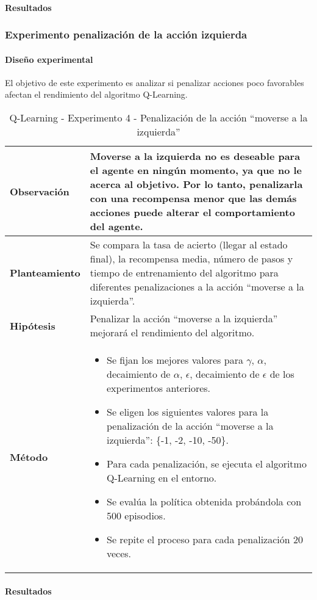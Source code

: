 \paragraph{Resultados}

\subsubsection{Experimento penalización de la acción izquierda}

\paragraph{Diseño experimental}
El objetivo de este experimento es analizar si penalizar acciones poco favorables afectan el rendimiento del algoritmo Q-Learning.
\begin{table}[H]
    \centering
    \begin{tabularx}{\textwidth}{|p{4cm}|X|} %
        \hline %
        \textbf{Observación} & Moverse a la izquierda no es deseable para el agente en ningún momento, ya que no le acerca al objetivo. Por lo tanto, penalizarla con una recompensa menor que las demás acciones puede alterar el comportamiento del agente.
        \\ \hline 
        \textbf{Planteamiento} & Se compara la tasa de acierto (llegar al estado final), la recompensa media, número de pasos y tiempo de entrenamiento del algoritmo para diferentes penalizaciones a la acción ``moverse a la izquierda''.
        \\ \hline
        \textbf{Hipótesis} & Penalizar la acción ``moverse a la izquierda'' mejorará el rendimiento del algoritmo.
        \\ \hline
        \textbf{Método} &
        \begin{itemize}
            \item Se fijan los mejores valores para \(\gamma\), \(\alpha\), decaimiento de \(\alpha\), \(\epsilon\), decaimiento de \(\epsilon\) de los experimentos anteriores.
            \item Se eligen los siguientes valores para la penalización de la acción ``moverse a la izquierda'': \{-1, -2, -10, -50\}.
            \item Para cada penalización, se ejecuta el algoritmo Q-Learning en el entorno.
            \item Se evalúa la política obtenida probándola con 500 episodios.
            \item Se repite el proceso para cada penalización 20 veces.
        \end{itemize}
        \\ \hline
    \end{tabularx}
    \caption{Q-Learning - Experimento 4 - Penalización de la acción ``moverse a la izquierda''}
    \label{tab:diseñoQLEarningExp4}
\end{table}

\paragraph{Resultados}